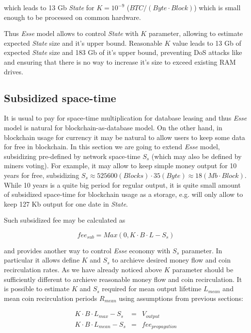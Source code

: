 \documentclass[]{article}   %
\newcommand{\esse}{\textit{Esse}}
\newcommand{\state}{\textit{State}}
\begin{document}
which leads to 13 Gb \state{} for $K=10^{-9}$ ($BTC / (Byte \cdot Block)$) which is small enough to be processed on common hardware.

Thus \esse{} model allows to control \state{} with $K$ parameter, allowing to estimate expected \state{} size and it's upper bound. Reasonable $K$ value leads to 13 Gb of expected \state{} size and 183 Gb of it's upper bound, preventing DoS attacks like \cite{bitcoin2015flood} and ensuring that there is no way to increase it's size to exceed existing RAM drives.

\subsection{Subsidized space-time}

It is usual to pay for space-time multiplication for database leasing and thus \esse{} model is natural for blockchain-as-database model. On the other hand, in blockchain usage for currency it may be natural to allow users to keep some data for free in blockchain. In this section we are going to extend \esse{} model, subsidizing pre-defined by network space-time $S_s$ (which may also be defined by miners voting). For example, it may allow to keep simple money output for 10 years for free, subsidizing $S_s \approx 525600 (Blocks) \cdot 35 (Byte) \approx 18 (Mb \cdot Block)$. While 10 years is a quite big period for regular output, it is quite small amount of subsidized space-time for blockchain usage as a storage, e.g. will only allow to keep 127 Kb output for one date in \state{}.

Such subsidized fee may be calculated as

\begin{equation}
fee_{sub} = Max(0, K \cdot B \cdot L - S_s)
\end{equation}

and provides another way to control \esse{} economy with $S_s$ parameter. In particular it allows define $K$ and $S_s$ to archieve desired money flow and coin recirculation rates. As we have already noticed above $K$ parameter should be sufficiently different to archieve reasonable money flow and coin recirculation. It is possible to estimate $K$ and $S_s$ required for mean output lifetime $L_{mean}$ and mean coin recirculation periods $R_{mean}$ using assumptions from previous sections:

\begin{equation}
  \begin{array}{ccl}
   K \cdot B \cdot L_{max} - S_s & = & V_{output} \\
   K \cdot B \cdot L_{mean} - S_s & = & fee_{propagation}
  \end{array}
\end{equation}
\end{document}
